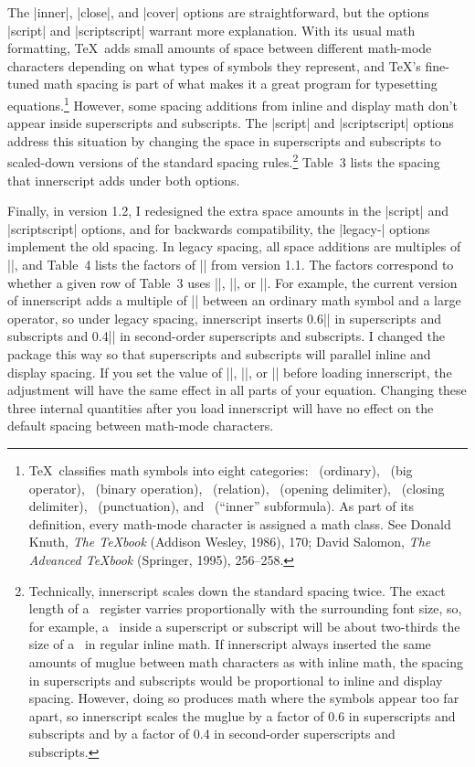 \documentclass[12pt]{article}
\begin{document}
The |inner|, |close|, and |cover| options are straightforward, but the options |script| and |scriptscript| warrant more explanation. With its usual math formatting, \TeX\ adds small amounts of space between different math-mode characters depending on what types of symbols they represent, and \TeX's fine-tuned math spacing is part of what makes it a great program for typesetting equations.\footnote{\TeX\ classifies math symbols into eight categories: \vrb\mathord\ (ordinary), \vrb\mathop\ (big operator), \vrb\mathbin\ (binary operation), \vrb\mathrel\ (relation), \vrb\mathopen\ (opening delimiter), \vrb\mathclose\ (closing delimiter), \vrb\mathpunct\ (punctuation), and \vrb\mathinner\ (``inner'' subformula). As part of its definition, every math-mode character is assigned a math class. See Donald Knuth, \textit{The \TeX book} (Addison Wesley, 1986), 170; David Salomon, \textit{The Advanced \TeX book} (Springer, 1995), 256--258.} However, some spacing additions from inline and display math don't appear inside superscripts and subscripts. The |script| and |scriptscript| options address this situation by changing the space in superscripts and subscripts to scaled-down versions of the standard spacing rules.\footnote{Technically, \textsf{innerscript} scales down the standard spacing twice. The exact length of a \vrb\muskip\ register varries proportionally with the surrounding font size, so, for example, a \vrb\thinmuskip\ inside a superscript or subscript will be about two-thirds the size of a \vrb\thinmuskip\ in regular inline math. If \textsf{innerscript} always inserted the same amounts of muglue between math characters as with inline math, the spacing in superscripts and subscripts would be proportional to inline and display spacing. However, doing so produces math where the symbols appear too far apart, so \textsf{innerscript} scales the muglue by a factor of 0.6 in superscripts and subscripts and by a factor of 0.4 in second-order superscripts and subscripts.} Table~3 lists the spacing that \textsf{innerscript} adds under both options.

Finally, in version 1.2, I redesigned the extra space amounts in the |script| and |scriptscript| options, and for backwards compatibility, the |legacy-| options implement the old spacing. In legacy spacing, all space additions are multiples of |\thinmuskip|, and Table~4 lists the factors of |\thinmuskip| from version 1.1. The factors correspond to whether a given row of Table~3 uses |\thinmuskip|, |\medmuskip|, or |\thickmuskip|. For example, the current version of \textsf{innerscript} adds a multiple of |\thinmuskip| between an ordinary math symbol and a large operator, so under legacy spacing, \textsf{innerscript} inserts 0.6|\thinmuskip| in superscripts and subscripts and 0.4|\thinmuskip| in second-order superscripts and subscripts. I changed the package this way so that superscripts and subscripts will parallel inline and display spacing. If you set the value of |\thinmuskip|, |\medmuskip|, or |\thickmuskip| before loading \textsf{innerscript}, the adjustment will have the same effect in all parts of your equation. Changing these three internal quantities after you load \textsf{innerscript} will have no effect on the default spacing between math-mode characters.
\end{document}
